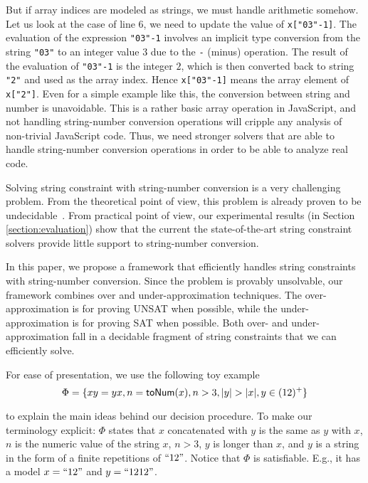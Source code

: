 \documentclass[sigplan,screen]{acmart}
\begin{document}
But if array indices are modeled as strings, we must handle arithmetic somehow. Let us look at the case of line 6, we need to update the value of \texttt{x["03"-1]}. The evaluation of the expression \texttt{"03"-1} involves an implicit type conversion from the string \texttt{"03"} to an integer value $3$ due to the \texttt{-} (minus) operation. The result of the evaluation of \texttt{"03"-1} is the integer $2$, which is then converted back to string \texttt{"2"} and used as the array index. Hence \texttt{x["03"-1]} means the array element of \texttt{x["2"]}. Even for a simple example like this, the conversion between string and number is unavoidable. This is a rather basic   array operation in JavaScript, and not  handling string-number conversion operations will cripple any analysis of non-trivial JavaScript code. Thus, we need stronger solvers that are  able to handle string-number conversion operations in order to be able to analyze  real code. 















Solving string constraint with string-number conversion is a very challenging problem. From the theoretical point of view, this problem is already proven to be undecidable~\cite{day2018satisfiability}. From practical point of view, 
 our experimental results  (in Section \ref{section:evaluation}) show that the current  the state-of-the-art string constraint solvers provide little support to string-number conversion. 


In this paper, we propose a framework that efficiently handles string constraints with string-number conversion. Since the problem is provably unsolvable, our framework combines over and under-approximation techniques. The over-approximation is for proving UNSAT when possible, while the under-approximation is for proving SAT when possible. Both over- and under-approximation fall in a decidable fragment of string constraints that  we can efficiently solve. 



For ease of presentation, we  use the following toy example $$\Phi = \{xy=yx, n = \sti{x}, n >3 ,|y|>|x|, y \in (12)^+\}$$

to explain the main ideas behind our decision procedure.  To make our terminology explicit: $\Phi$ states that $x$ concatenated with $y$ is the same as $y$ with $x$, $n$ is the numeric value of the string $x$, $n > 3$, $y$ is longer than $x$, and $y$ is a string in the form of a finite repetitions of $``12"$.  Notice that $\Phi$ is satisfiable. E.g., it has a model $x=``12"$ and $y=``1212"$.
\end{document}
